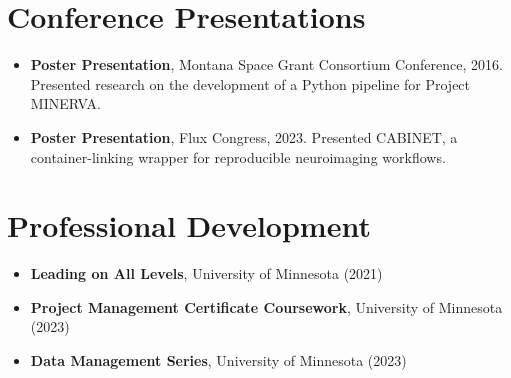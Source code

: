 \documentclass[a4paper,11pt]{article}
\begin{document}
\section{Conference Presentations}
\begin{justify}\begin{itemize}[leftmargin=3ex, rightmargin=2ex, labelsep=1.2mm, itemsep=2.2mm, topsep=1.5mm]\small
\item[] \textbf{Poster Presentation}, Montana Space Grant Consortium Conference, 2016. Presented research on the development of a Python pipeline for Project MINERVA.
\item[] \textbf{Poster Presentation}, Flux Congress, 2023. Presented CABINET, a container-linking wrapper for reproducible neuroimaging workflows.
\end{itemize}\end{justify}
\vspace{-1mm}

\section{Professional Development}
\begin{justify}\begin{itemize}[leftmargin=3ex, rightmargin=2ex, labelsep=1.2mm, itemsep=2.2mm, topsep=1.5mm]\small
\item[] \textbf{Leading on All Levels}, University of Minnesota (2021)
\item[] \textbf{Project Management Certificate Coursework}, University of Minnesota (2023)
\item[] \textbf{Data Management Series}, University of Minnesota (2023)
\end{itemize}\end{justify}
\vspace{-1mm}

\end{document}
